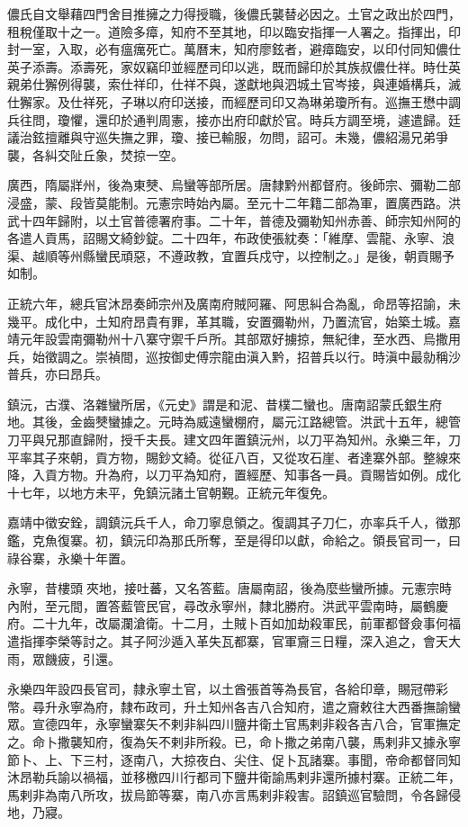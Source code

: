 \begin{pinyinscope}
儂氏自文舉藉四門舍目推擁之力得授職，後儂氏襲替必因之。土官之政出於四門，租稅僅取十之一。道險多瘴，知府不至其地，印以臨安指揮一人署之。指揮出，印封一室，入取，必有瘟癘死亡。萬曆末，知府廖鉉者，避瘴臨安，以印付同知儂仕英子添壽。添壽死，家奴竊印並經歷司印以逃，既而歸印於其族叔儂仕祥。時仕英親弟仕獬例得襲，索仕祥印，仕祥不與，遂獻地與泗城土官岑接，與連婚構兵，滅仕獬家。及仕祥死，子琳以府印送接，而經歷司印又為琳弟瓊所有。巡撫王懋中調兵往問，瓊懼，還印於通判周憲，接亦出府印獻於官。時兵方調至境，遽遣歸。廷議治鉉擅離與守巡失撫之罪，瓊、接已輸服，勿問，詔可。未幾，儂紹湯兄弟爭襲，各糾交阯丘象，焚掠一空。

廣西，隋屬牂州，後為東僰、烏蠻等部所居。唐隸黔州都督府。後師宗、彌勒二部浸盛，蒙、段皆莫能制。元憲宗時始內屬。至元十二年籍二部為軍，置廣西路。洪武十四年歸附，以土官普德署府事。二十年，普德及彌勒知州赤善、師宗知州阿的各遣人貢馬，詔賜文綺鈔錠。二十四年，布政使張紞奏：「維摩、雲龍、永寧、浪渠、越順等州縣蠻民頑惡，不遵政教，宜置兵戍守，以控制之。」是後，朝貢賜予如制。

正統六年，總兵官沐昂奏師宗州及廣南府賊阿羅、阿思糾合為亂，命昂等招諭，未幾平。成化中，土知府昂貴有罪，革其職，安置彌勒州，乃置流官，始築土城。嘉靖元年設雲南彌勒州十八寨守禦千戶所。其部眾好擄掠，無紀律，至水西、烏撒用兵，始徵調之。崇禎間，巡按御史傅宗龍由滇入黔，招普兵以行。時滇中最勍稱沙普兵，亦曰昂兵。

鎮沅，古濮、洛雜蠻所居，《元史》謂是和泥、昔樸二蠻也。唐南詔蒙氏銀生府地。其後，金齒僰蠻據之。元時為威遠蠻棚府，屬元江路總管。洪武十五年，總管刀平與兄那直歸附，授千夫長。建文四年置鎮沅州，以刀平為知州。永樂三年，刀平率其子來朝，貢方物，賜鈔文綺。從征八百，又從攻石崖、者達寨外部。整線來降，入貢方物。升為府，以刀平為知府，置經歷、知事各一員。貢賜皆如例。成化十七年，以地方未平，免鎮沅諸土官朝覲。正統元年復免。

嘉靖中徵安銓，調鎮沅兵千人，命刀寧息領之。復調其子刀仁，亦率兵千人，徵那鑑，克魚復寨。初，鎮沅印為那氏所奪，至是得印以獻，命給之。領長官司一，曰祿谷寨，永樂十年置。

永寧，昔樓頭夾地，接吐蕃，又名答藍。唐屬南詔，後為麼些蠻所據。元憲宗時內附，至元間，置答藍管民官，尋改永寧州，隸北勝府。洪武平雲南時，屬鶴慶府。二十九年，改屬瀾滄衛。十二月，土賊卜百如加劫殺軍民，前軍都督僉事何福遣指揮李榮等討之。其子阿沙遁入革失瓦都寨，官軍齎三日糧，深入追之，會天大雨，眾饑疲，引還。

永樂四年設四長官司，隸永寧土官，以土酋張首等為長官，各給印章，賜冠帶彩幣。尋升永寧為府，隸布政司，升土知州各吉八合知府，遣之齎敕往大西番撫諭蠻眾。宣德四年，永寧蠻寨矢不剌非糾四川鹽井衛土官馬剌非殺各吉八合，官軍撫定之。命卜撒襲知府，復為矢不剌非所殺。已，命卜撒之弟南八襲，馬剌非又據永寧節卜、上、下三村，逐南八，大掠夜白、尖住、促卜瓦諸寨。事聞，帝命都督同知沐昂勒兵諭以禍福，並移檄四川行都司下鹽井衛諭馬剌非還所據村寨。正統二年，馬剌非為南八所攻，拔烏節等寨，南八亦言馬剌非殺害。詔鎮巡官驗問，令各歸侵地，乃寢。


\end{pinyinscope}
